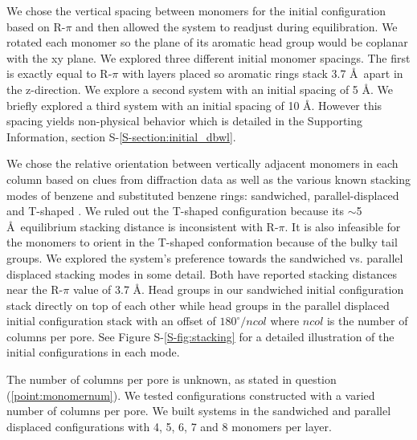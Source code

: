 \documentclass[journal=jpcbfk,manuscript=article]{achemso}
\begin{document}
  We chose the vertical spacing between monomers for the initial configuration based
  on R-$\pi$ and then allowed the system to readjust during equilibration. We rotated 
  each monomer so the plane of its aromatic head group would be coplanar with the xy plane. We
  explored three different initial monomer spacings. The first is exactly
  equal to R-$\pi$ with layers placed so aromatic rings stack 3.7 \AA~apart in
  the z-direction. We explore a second system with an initial spacing of 5
  \AA. We briefly explored a third system with an initial spacing of 10
  \AA. However this spacing yields non-physical behavior which is detailed in the 
  Supporting Information, section S-\ref{S-section:initial_dbwl}. 


  We chose the relative orientation between vertically adjacent monomers in each column 
  based on clues from diffraction data as well as the various known stacking modes of 
  benzene and substituted benzene rings: sandwiched, parallel-displaced and T-shaped
  \cite{sinnokrot_estimates_2002}. We ruled out the T-shaped configuration
  because its $\sim$5 \AA~equilibrium stacking distance \cite{sinnokrot_estimates_2002}
  is inconsistent with R-$\pi$. It is also infeasible for the monomers to orient in the 
  T-shaped conformation because of the bulky tail groups. We explored the system's 
  preference towards the sandwiched vs. parallel displaced stacking modes in some detail.
  Both have reported stacking distances near the R-$\pi$ value of 3.7 \AA. Head groups in
  our sandwiched initial configuration stack directly on top of each other while
  head groups in the parallel displaced initial configuration stack with an offset
  of $180^\circ/ncol$ where $ncol$ is the number of columns per pore. See Figure 
  S-\ref{S-fig:stacking} for a detailed illustration of the initial configurations in each mode.
  

  The number of columns per pore is unknown, as stated in question
  (\ref{point:monomernum}). We tested configurations constructed with a varied
  number of columns per pore. We built systems in the sandwiched and parallel
  displaced configurations with 4, 5, 6, 7 and 8 monomers per layer.
\end{document}
